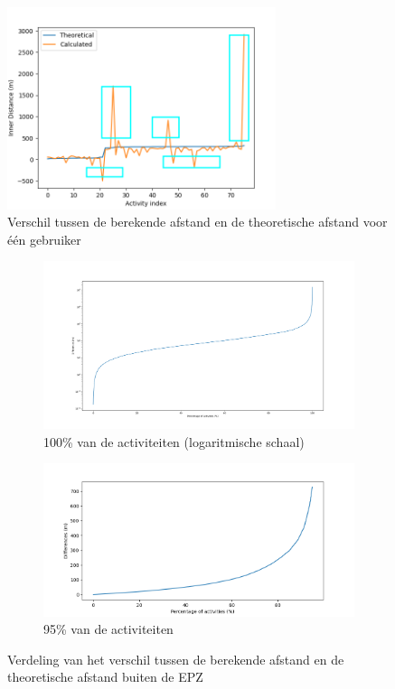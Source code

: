 \begin{figure}[h]
    \centering
    \includegraphics[width=0.7\textwidth]{fig/Afwijkingen&Analyses/Graphs/Verschil_Theoretische_innerDistance.png}
    \caption{Verschil tussen de berekende afstand en de theoretische afstand voor één gebruiker}\label{fig:difference_noCDF}
\end{figure}
\begin{figure}[h]
    \centering
    \begin{subfigure}{\textwidth}
        \includegraphics[width=\textwidth]{fig/Afwijkingen&Analyses/Graphs/100_Differences_tov_theoretische_BefSmoothening.png}
        \caption{100\% van de activiteiten (logaritmische schaal)}\label{fig:differences_log}
    \end{subfigure}
    \begin{subfigure}[b]{\textwidth}
        \includegraphics[width=\textwidth]{fig/Afwijkingen&Analyses/Graphs/95_Differences_tov_theoretische_BefSmoothening.png}
        \caption{95\% van de activiteiten}\label{fig:differences_nolog}
    \end{subfigure}
    \caption{Verdeling van het verschil tussen de berekende afstand en de theoretische afstand buiten de \ac{EPZ} }\label{fig:differences_theoretical}
\end{figure}

